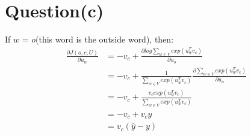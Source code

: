 \documentclass[11pt]{article}
\begin{document}
\section{Question(c)}
If $w$ = $o$(this word is the outside word), then:
\begin{equation}
\begin{aligned}
\frac{\partial J(o, c, U)}{\partial u_w} &= -v_c + \frac{\partial log\sum_{w \in V} exp(u_w^Tv_c)}{\partial u_o} \\
&= -v_c + \frac{1}{\sum_{w \in V} exp(u_w^Tv_c)}\frac{\partial{\sum_{w \in V} exp(u_w^Tv_c)}}{\partial u_o}\\ 
&= -v_c + \frac{v_cexp(u_w^Tv_c)}{\sum_{w \in V} exp(u_w^Tv_c)}\\
&= -v_c + v_c\hat y\\
&= v_c(\hat y - y)
\end{aligned}
\end{equation} 
\end{document}
